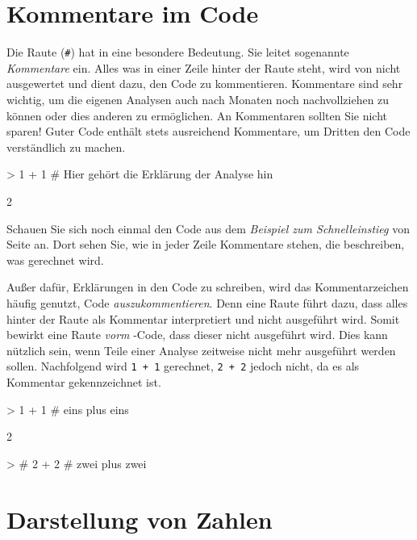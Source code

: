 \section{Kommentare im Code}

Die Raute (\verb!#!) hat in \R{} eine besondere Bedeutung. Sie leitet sogenannte \emph{Kommentare} ein. Alles was in einer Zeile hinter der Raute steht, wird von \R{} nicht ausgewertet und dient dazu, den Code zu kommentieren. Kommentare sind sehr wichtig, um die eigenen Analysen auch nach Monaten noch nachvollziehen zu können oder dies anderen zu ermöglichen. An Kommentaren sollten Sie nicht sparen! Guter Code enthält stets ausreichend Kommentare, um Dritten den Code verständlich zu machen.

\begin{Schunk}
\begin{Sinput}
> 1 + 1   # Hier gehört die Erklärung der Analyse hin
\end{Sinput}
\begin{Soutput}
[1] 2
\end{Soutput}
\end{Schunk}
 
Schauen Sie sich noch einmal den Code aus dem \emph{Beispiel zum Schnelleinstieg} von Seite \pageref{fig:r_beispiel_2} an. Dort sehen Sie, wie in jeder Zeile Kommentare stehen, die beschreiben, was gerechnet wird. 

Außer dafür, Erklärungen in den Code zu schreiben, wird das Kommentarzeichen häufig genutzt, Code \emph{auszukommentieren}. Denn eine Raute führt dazu, dass alles hinter der Raute als Kommentar interpretiert und nicht ausgeführt wird. Somit bewirkt eine Raute \emph{vorm} \R{}-Code, dass dieser nicht ausgeführt wird. Dies kann nützlich sein, wenn Teile einer Analyse zeitweise nicht mehr ausgeführt werden sollen. Nachfolgend wird \texttt{1 + 1} gerechnet, \texttt{2 + 2} jedoch nicht, da es als Kommentar gekennzeichnet ist.

\begin{Schunk}
\begin{Sinput}
> 1 + 1       # eins plus eins
\end{Sinput}
\begin{Soutput}
[1] 2
\end{Soutput}
\begin{Sinput}
> # 2 + 2     # zwei plus zwei
\end{Sinput}
\end{Schunk}
   

\section{Darstellung von Zahlen}  

